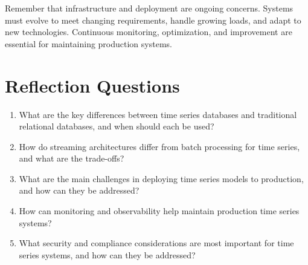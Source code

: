 Remember that infrastructure and deployment are ongoing concerns. Systems must evolve to meet changing requirements, handle growing loads, and adapt to new technologies. Continuous monitoring, optimization, and improvement are essential for maintaining production systems.

\section*{Reflection Questions}

\begin{enumerate}
\item What are the key differences between time series databases and traditional relational databases, and when should each be used?

\item How do streaming architectures differ from batch processing for time series, and what are the trade-offs?

\item What are the main challenges in deploying time series models to production, and how can they be addressed?

\item How can monitoring and observability help maintain production time series systems?

\item What security and compliance considerations are most important for time series systems, and how can they be addressed?
\end{enumerate}

